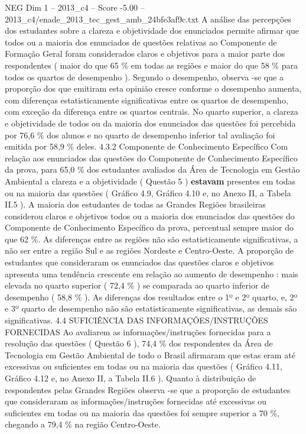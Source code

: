 \begin{textsample}{NEG Dim 1 – 2013\_c4 – Score -5.00 – 2013\_c4/enade\_2013\_tec\_gest\_amb\_24bfe3af9c.txt}
A análise das percepções dos estudantes sobre a clareza e objetividade dos enunciados permite afirmar que todos ou a maioria dos enunciados de questões relativas ao Componente de Formação Geral foram considerados claros e objetivos para a maior parte dos respondentes ( maior do que 65 \% em todas as regiões e maior do que 58 \% para todos os quartos de desempenho ).
Segundo o desempenho, observa -se que a proporção dos que emitiram esta opinião cresce conforme o desempenho aumenta, com diferenças estatisticamente significativas entre os quartos de desempenho, com exceção da diferença entre os quartos centrais.
No quarto superior, a clareza e objetividade de todos ou da maioria dos enunciados das questões foi percebida por 76,6 \% dos alunos e no quarto de desempenho inferior tal avaliação foi emitida por 58,9 \% deles. 4.3.2 Componente de Conhecimento Específico Com relação aos enunciados das questões do Componente de Conhecimento Específico da prova, para 65,0 \% dos estudantes avaliados da Área de Tecnologia em Gestão Ambiental a clareza e a objetividade ( Questão 5 ) \textbf{estavam} presentes em todas ou na maioria das questões ( Gráfico 4.9, Gráfico 4.10 e, no Anexo II, a Tabela II.5 ).
A maioria dos estudantes de todas as Grandes Regiões brasileiras considerou claros e objetivos todos ou a maioria dos enunciados das questões do Componente de Conhecimento Específico da prova, percentual sempre maior do que 62 \%.
As diferenças entre as regiões não são estatisticamente significativas, a não ser entre a região Sul e as regiões Nordeste e Centro-Oeste.
A proporção de estudantes que consideraram os enunciados das questões claros e objetivos apresenta uma tendência crescente em relação ao aumento de desempenho : mais elevada no quarto superior ( 72,4 \% ) se comparada ao quarto inferior de desempenho ( 58,8 \% ).
As diferenças dos resultados entre o 1º e 2º quarto, e, 2º e 3º quarto de desempenho não são estatisticamente significativas, as demais são significativas. 4.4 SUFICIÊNCIA DAS INFORMAÇÕES/INSTRUÇÕES FORNECIDAS Ao avaliarem as informações/instruções fornecidas para a resolução das questões ( Questão 6 ), 74,4 \% dos respondentes da Área de Tecnologia em Gestão Ambiental de todo o Brasil afirmaram que estas eram até excessivas ou suficientes em todas ou na maioria das questões ( Gráfico 4.11, Gráfico 4.12 e, no Anexo II, a Tabela II.6 ).
Quanto à distribuição de respondentes pelas Grandes Regiões observa -se que a proporção de estudantes que consideraram as informações/instruções fornecidas até excessivas ou suficientes em todas ou na maioria das questões foi sempre superior a 70 \%, chegando a 79,4 \% na região Centro-Oeste.

\end{textsample}

